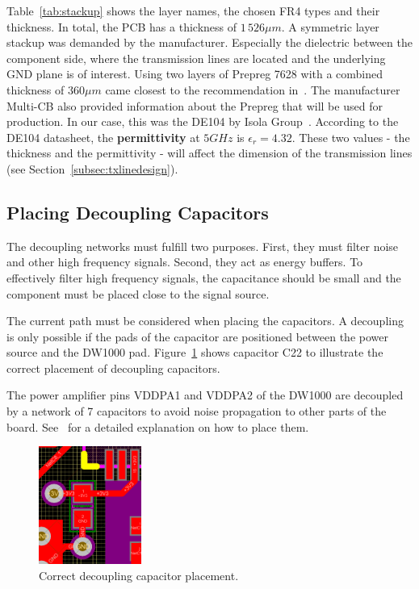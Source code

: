 \documentclass[journal,comsoc]{IEEEtran}
\begin{document}
Table~\ref{tab:stackup} shows the layer names, the chosen FR4 types and their thickness. 
In total, the PCB has a thickness of $1\,526\mu m$. 
A symmetric layer stackup was demanded by the manufacturer. 
Especially the dielectric between the component side, where the transmission lines are located and the underlying GND plane is of interest.
Using two layers of Prepreg 7628 with a combined thickness of $360\mu m$ came closest to the recommendation in~\cite{dw1000hwdesignguide}. 
The manufacturer Multi-CB also provided information about the Prepreg that will be used for production.
In our case, this was the DE104 by Isola Group~\cite{fr4datasheet}.
According to the DE104 datasheet, the \textbf{permittivity} at $5GHz$ is $\epsilon_r = 4.32$. 
These two values - the thickness and the permittivity - will affect the dimension of the transmission lines (see Section~\ref{subsec:txlinedesign}).

\subsection{Placing Decoupling Capacitors}
\label{subsec:placingcaps}
The decoupling networks must fulfill two purposes.
First, they must filter noise and other high frequency signals. 
Second, they act as energy buffers. 
To effectively filter high frequency signals, the capacitance should be small and the component must be placed close to the signal source.

The current path must be considered when placing the capacitors.
A decoupling is only possible if the pads of the capacitor are positioned between the power source and the DW1000 pad.
Figure~\ref{fig:decap} shows capacitor C22 to illustrate the correct placement of decoupling capacitors.

The power amplifier pins VDDPA1 and VDDPA2 of the DW1000 are decoupled by a network of 7 capacitors to avoid noise propagation to other parts of the board. 
See~\cite[chapter 6.3]{dw1000hwdesignguide} for a detailed explanation on how to place them.
\begin{figure}[h!]
	\centering
	\includegraphics[width=0.3\textwidth]{Figures/decap}
	\caption{Correct decoupling capacitor placement.}
	\label{fig:decap}
\end{figure}
\end{document}
